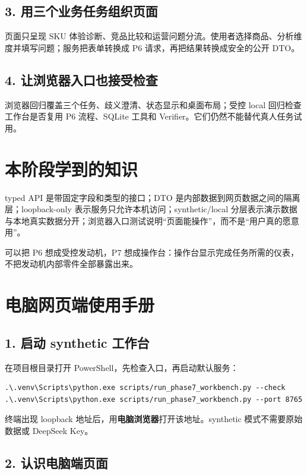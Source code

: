 \subsection{3. 用三个业务任务组织页面}

页面只呈现 SKU 体验诊断、竞品比较和运营问题分流。使用者选择商品、分析维度并填写问题；服务把表单转换成 P6 请求，再把结果转换成安全的公开 DTO。

\subsection{4. 让浏览器入口也接受检查}

浏览器回归覆盖三个任务、歧义澄清、状态显示和桌面布局；受控 local 回归检查工作台是否复用 P6 流程、SQLite 工具和 Verifier。它们仍然不能替代真人任务试用。

\section{本阶段学到的知识}

typed API 是带固定字段和类型的接口；DTO 是内部数据到网页数据之间的隔离层；loopback-only 表示服务只允许本机访问；synthetic/local 分层表示演示数据与本地真实数据分开；浏览器入口测试说明“页面能操作”，而不是“用户真的愿意用”。

可以把 P6 想成受控发动机，P7 想成操作台：操作台显示完成任务所需的仪表，不把发动机内部零件全部暴露出来。

\section{电脑网页端使用手册}

\subsection{1. 启动 synthetic 工作台}

在项目根目录打开 PowerShell，先检查入口，再启动默认服务：

\begin{lstlisting}
.\.venv\Scripts\python.exe scripts/run_phase7_workbench.py --check
.\.venv\Scripts\python.exe scripts/run_phase7_workbench.py --port 8765
\end{lstlisting}

终端出现 loopback 地址后，用\textbf{电脑浏览器}打开该地址。synthetic 模式不需要原始数据或 DeepSeek Key。

\subsection{2. 认识电脑端页面}

